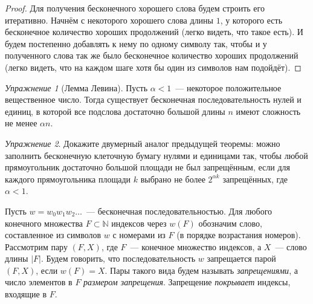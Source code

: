 \documentclass[12pt]{article}
\theoremstyle{definition}
\theoremstyle{plain}
\theoremstyle{remark}
\newtheorem{exercise}{Упражнение}[section]
\begin{document}
\begin{proof}
    Для получения бесконечного хорошего слова будем строить его итеративно.
    Начнём с некоторого хорошего слова длины $1$, у которого есть бесконечное количество 
    хороших продолжений (легко видеть, что такое есть). И будем постепенно добавлять к нему 
    по одному символу так, чтобы и у полученного слова так же было бесконечное количество 
    хороших продолжений (легко видеть, что на каждом шаге хотя бы один из символов нам 
    подойдёт).
\end{proof}
\begin{exercise}[Лемма Левина]
    Пусть $\alpha < 1$~--- некоторое положительное вещественное число.
    Тогда существует бесконечная последовательность нулей и единиц,
    в которой все подслова достаточно большой длины $n$ имеют сложность
    не менее $\alpha n$.
\end{exercise}
\begin{exercise}\label{ex:lll:rects}
    Докажите двумерный аналог предыдущей теоремы: можно заполнить бесконечную
    клеточную бумагу нулями и единицами так, чтобы любой прямоугольник
    достаточно большой площади не был запрещённым, если для каждого
    прямоугольника площади $k$ выбрано не более $2^{\alpha k}$ запрещённых,
    где $\alpha < 1$.
\end{exercise}

Пусть $w=w_0w_1w_2\dotso$~--- бесконечная последовательностью. Для любого конечного
множества $F\subset\mathbb{N}$ индексов через $w(F)$ обозначим слово, составленное
из символов $w$ с номерами из $F$ (в порядке возрастания номеров). Рассмотрим пару $(F, X)$,
где $F$~--- конечное множество индексов, а $X$~--- слово длины $|F|$. Будем говорить,
что последовательность $w$ запрещается парой $(F,X)$, если $w(F) = X$. Пары такого
вида будем называть \emph{запрещениями}, а число элементов в $F$ \emph{размером 
запрещения}. Запрещение \emph{покрывает} индексы, входящие в $F$.
\end{document}
